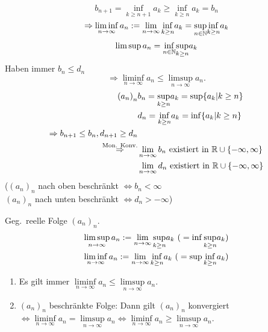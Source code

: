 \documentclass[../ana1.tex]{subfiles}
\begin{document}
\[ b_{n+1} = \underset{k\geq n+1}{\inf} a_k \geq \underset{k\geq n}{\inf} a_k = b_n \]
\[ \Rightarrow \liminf\limits_{n\rightarrow\infty} a_n := \lim\limits_{n\rightarrow\infty} \underset{k\geq n}{\inf} a_k = \underset{n\in\mathbb{N}}{\sup} \underset{k\geq n}{\inf} a_k \]
\[ \limsup a_n = \underset{n\in\mathbb{N}}{\inf} \underset{k\geq n}{\sup} a_k \]
Haben immer \(b_n \leq d_n\)
\[ \Rightarrow \liminf\limits_{n\rightarrow\infty} a_n \leq \limsup\limits_{n\rightarrow\infty} a_n. \]
\begin{align*}
	{(a_n)}_n &b_n = \underset{k\geq n}{\sup} a_k = \sup \{ a_k | k\geq n \} \\
	&d_n = \underset{k\geq n}{\inf} a_k = \inf \{ a_k | k\geq n \} \\
	\Rightarrow b_{n+1} \leq b_n, d_{n+1} \geq d_n\\
	\overset{\text{Mon. Konv.}}{\Rightarrow} &\lim\limits_{n\rightarrow\infty} b_n \text{ existiert in }\mathbb{R} \cup \{-\infty, \infty \} \\
	&\lim\limits_{n\rightarrow\infty} d_n \text{ existiert in }\mathbb{R} \cup \{-\infty, \infty \}
\end{align*}
(\({(a_n)}_n\) nach oben beschränkt \(\Leftrightarrow b_n < \infty \) \\
\({(a_n)}_n\) nach unten beschränkt \(\Leftrightarrow d_n > -\infty \))
\begin{defi}
	Geg.\ reelle Folge \({(a_n)}_n\).
	\begin{align*}
		\limsup\limits_{n\rightarrow\infty} a_n := \lim\limits_{n\rightarrow\infty}\underset{k\geq n}{\sup} a_k \text{ (}=\inf\underset{k\geq{}n}{\sup}a_k \text{)}\\
		\liminf\limits_{n\rightarrow\infty} a_n := \lim\limits_{n\rightarrow\infty}\underset{k\geq n}{\inf} a_k \text{ (}=\sup\underset{k\geq{}n}{\inf}a_k \text{)}
	\end{align*}
\end{defi}
\begin{lem}
	\begin{enumerate}
		\item Es gilt immer \( \liminf\limits_{n\rightarrow\infty}a_n \leq \limsup\limits_{n\rightarrow\infty}a_n \).
		\item \({(a_n)}_n\) beschränkte Folge: Dann gilt \({(a_n)}_n\) konvergiert \( \Leftrightarrow \liminf\limits_{n\rightarrow\infty}a_n = \limsup\limits_{n\rightarrow\infty}a_n \Leftrightarrow \liminf\limits_{n\rightarrow\infty}a_n \geq \limsup\limits_{n\rightarrow\infty}a_n \).
	\end{enumerate}
\end{lem}
\end{document}
